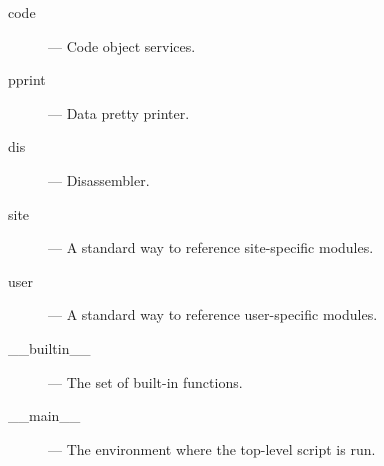 \begin{description}
\item[code]
--- Code object services.

\item[pprint]
--- Data pretty printer.

\item[dis]
--- Disassembler.

\item[site]
--- A standard way to reference site-specific modules.

\item[user]
--- A standard way to reference user-specific modules.

\item[__builtin__]
--- The set of built-in functions.

\item[__main__]
--- The environment where the top-level script is run.

\end{description}
